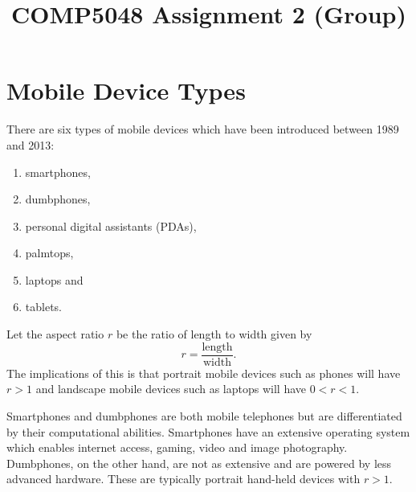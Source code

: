 \documentclass[conference]{IEEEtran}
\begin{document}
\title{COMP5048 Assignment 2 (Group)}

\author{
\and
{}
\IEEEauthorblockA{}
\and
{}
\and
{}
\IEEEauthorblockA{}
\and
{}
\IEEEauthorblockA{}
}

\maketitle

\begin{abstract}
\end{abstract}


\section{Mobile Device Types}

There are six types of mobile devices which have been introduced between 1989
and 2013:
\begin{enumerate}
	\item smartphones,
	\item dumbphones,
	\item personal digital assistants (PDAs),
	\item palmtops,
	\item laptops and
	\item tablets.
\end{enumerate}

Let the aspect ratio $r$ be the ratio of length to width given by
\[ r = \frac{\text{length}}{\text{width}}. \]
The implications of this is that portrait mobile devices such as phones will
have $r>1$ and landscape mobile devices such as laptops will have $0<r<1$.

Smartphones and dumbphones are both mobile telephones but are differentiated by
their computational abilities. Smartphones have an extensive operating system
which enables internet access, gaming, video and image photography. Dumbphones,
on the other hand, are not as extensive and are powered by less advanced
hardware. These are typically portrait hand-held devices with $r>1$.
\end{document}

